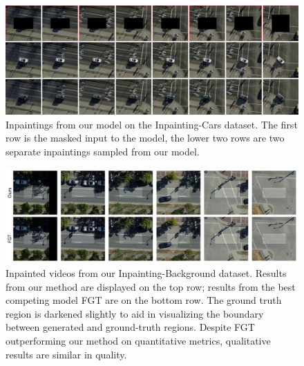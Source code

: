 \begin{figure}
    \begin{center}
        \centering
        \captionsetup{type=figure}
        \includegraphics[width=\linewidth]{figures/updated-cars.pdf}
        \caption[Inpaintings from our model on the Inpainting-Cars dataset.]{Inpaintings from our model on the Inpainting-Cars dataset. The first row is the masked input to the model, the lower two rows are two separate inpaintings sampled from our model.}
        \label{fig:cars}
    \end{center}%
\end{figure}

\begin{figure}
    \centering
    \includegraphics[width=\linewidth]{figures/bg_3119.pdf}
    \caption[A comparison of inpaintings from our method and FGT on a video from our Inpainting-Background dataset.]{Inpainted videos from our Inpainting-Background dataset. Results from our method are displayed on the top row; results from the best competing model FGT \citep{fgt} are on the bottom row. The ground truth region is darkened slightly to aid in visualizing the boundary between generated and ground-truth regions. Despite FGT outperforming our method on quantitative metrics, qualitative results are similar in quality.}
    \label{fig:background}
\end{figure}



